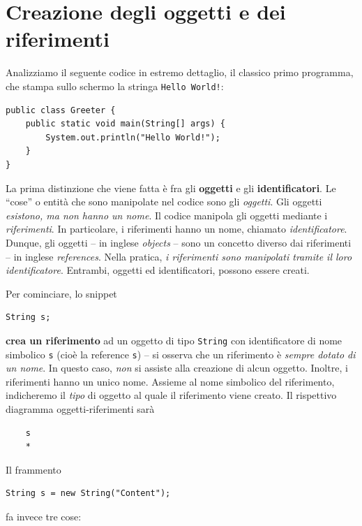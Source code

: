 \documentclass[\fontsizeclass,twocolumn]{\classname}
\theoremstyle{definition}
\theoremstyle{definition}
\begin{document}
\section{Creazione degli oggetti e dei riferimenti}

Analizziamo il seguente codice in estremo dettaglio, il classico primo
programma, che stampa sullo schermo la stringa \texttt{Hello World!}:

\begin{lstlisting}
public class Greeter {
	public static void main(String[] args) {
		System.out.println("Hello World!");
	}
}
\end{lstlisting}

La prima distinzione che viene fatta è fra gli \textbf{oggetti} e gli
\textbf{identificatori}. Le ``cose'' o entità che sono manipolate nel codice
sono gli \emph{oggetti}. Gli oggetti \emph{esistono, ma non hanno un nome}. Il
codice manipola gli oggetti mediante i \emph{riferimenti}. In particolare, i
riferimenti hanno un nome, chiamato \emph{identificatore}. Dunque, gli oggetti
\--- in inglese \emph{objects} \--- sono un concetto diverso dai riferimenti
\--- in inglese \emph{references}. Nella pratica, \emph{i riferimenti sono
manipolati tramite il loro identificatore}. Entrambi, oggetti ed
identificatori, possono essere creati.

Per cominciare, lo snippet

\begin{lstlisting}
String s;
\end{lstlisting}

\textbf{crea un riferimento} ad un oggetto di tipo \texttt{String} con
identificatore di nome simbolico \texttt{s} (cioè la reference \texttt s) \---
si osserva che un riferimento è \emph{sempre dotato di un nome}. In questo
caso, \emph{non} si assiste alla creazione di alcun oggetto. Inoltre, i
riferimenti hanno un unico nome. Assieme al nome simbolico del riferimento,
indicheremo il \emph{tipo} di oggetto al quale il riferimento viene creato. Il
rispettivo diagramma oggetti-riferimenti sarà

\begin{verbatim}
    s
    *
\end{verbatim}

Il frammento

\begin{lstlisting}
String s = new String("Content");
\end{lstlisting}

fa invece tre cose:
\end{document}
